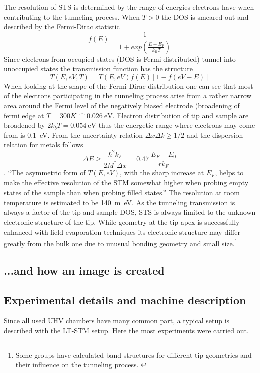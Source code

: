 The resolution of STS is determined by the range of energies electrons have when contributing to the tunneling process. When $T>0$ the DOS is smeared out and described by the Fermi-Dirac statistic\cite{fermi_zur_1926, dirac_theory_1926} $$f(E)=\frac{1}{1+exp\left(\frac{E-E_F}{k_BT}\right)}$$ 
Since electrons from occupied states (DOS is Fermi distributed) tunnel into unoccupied states the transmission function has the structure $$T(E,eV,T)=T(E,eV)f(E)[1-f(eV-E)]$$ 
When looking at the shape of the Fermi-Dirac distribution one can see that most of the electrons participating in the tunneling process arise from a rather narrow area around the Fermi level of the negatively biased electrode (broadening of fermi edge at $T=300K\,\hat=\SI{0.026}{\eV}$. Electron distribution of tip and sample are broadened by $2 k_b T=\SI{0.054}{\eV}$ thus the energetic range where electrons may come from is \SI{0.1}{\eV}. From the uncertainty relation $\Delta x \Delta k \geq 1/2$ and the dispersion relation for metals follows $$ \Delta E\ge \frac{\hbar^2k_F}{2M^*\Delta x}=0.47\ \frac{E_F-E_0}{rk_F} $$\cite{chen_introduction_2008}. ``The asymmetric form of $T(E,eV)$, with the sharp increase at $E_F$, helps to make the effective resolution of the STM somewhat higher when probing empty states of the sample than when probing filled states.''
The resolution at room temperature is estimated to be \SI{140}{\m\eV}\cite{hansma_tunneling_1982}.
As the tunneling transmission is always a factor of the tip and sample DOS, STS is always limited to the unknown electronic structure of the tip. While geometry at the tip apex is successfully enhanced with field evaporation techniques its electronic structure may differ greatly from the bulk one due to unusual bonding geometry and small size.\footnote{ Some\cite{tersoff_role_1990,ciraci_tip-sample_1990,lawunmi_theoretical_1990,kobayashi_simulation_1990} groups have calculated band structures for different tip geometries and their influence on the tunneling process. \label{section:AFM-resolution}}
\subsection{...and how an image is created}
\subsection{Experimental details and machine description}

Since all used UHV chambers have many common part, a typical setup is described with the LT-STM setup. Here the most experiments were carried out.

